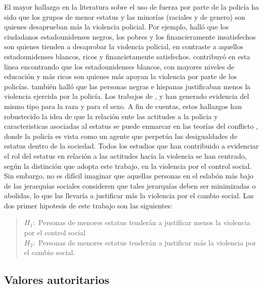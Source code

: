 \documentclass[12pt,twoside]{templates/facsothesis}
\begin{document}
El mayor hallazgo en la literatura sobre el uso de fuerza por parte de la policía ha sido que los grupos de menor estatus y las minorías (raciales y de genero) son quienes desaprueban más la violencia policial. Por ejemplo, \citet{Gamson1970} halló que los ciudadanos estadounidenses negros, los pobres y los financieramente insatisfechos son quienes tienden a desaprobar la violencia policial, en contraste a aquellos estadounidenses blancos, ricos y financietamente satisfechos. \citet{Arthur1994} contribuyó en esta linea encontrando que los estadounidenses blancos, con mayores niveles de educación y más ricos son quienes más apoyan la violencia por parte de los policías. \citet{Weitzer2002} también halló que las personas negras e hispanas justificaban menos la violencia ejercida por la policía. Los trabajos de \citet{Blumenthal1972}, \citet{Thompson2004} y \citet{Johnson2009} han generado evidencia del mismo tipo para la raza y para el sexo. A fin de cuentas, estos hallazgos han robustecido la idea de que la relación ente las actitudes a la policia y caracteristicas asociadas al estatus se puede enmarcar en las teorías del conflicto \citep{Chambliss1995, Quinney1971, Turk1969}, donde la policía es vista como un agente que perpetúa las desigualdades de estatus dentro de la sociedad. Todos los estudios que han contribuido a evidenciar el rol del estatus en relación a las actitudes hacia la violencia se han centrado, según la distinción que adopta este trabajo, en la violencia por el control social. Sin embargo, no es difícil imaginar que aquellas personas en el eslabón más bajo de las jerarquías sociales consideren que tales jerarquías deben ser minimizadas o abolidas, lo que las llevaría a justificar más la violencia por el cambio social. Las dos primer hipotesis de este trabajo son las siguientes:

\begin{quote}
\(H_1:\) Personas de menores estatus tenderán a justificar menos la violencia por el control social\\
\(H_2:\) Personas de menores estatus tenderán a justificar más la violencia por el cambio social.
\end{quote}

\hypertarget{valores-autoritarios}{%
\subsection{Valores autoritarios}\label{valores-autoritarios}}
\end{document}
